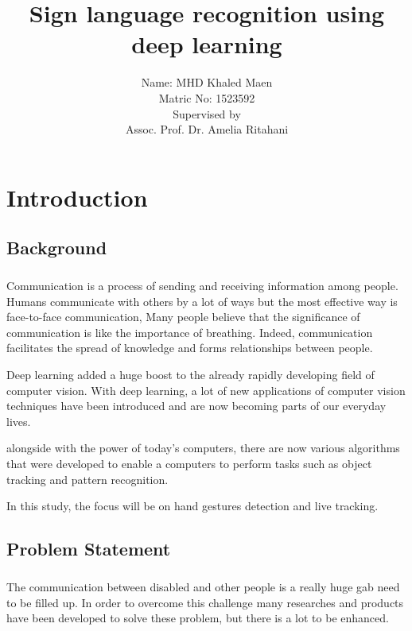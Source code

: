 \documentclass[12pt]{report}
\title{Sign language recognition using deep learning}
\author{ Name: MHD Khaled Maen\\
        Matric No: 1523592 \\ 
        [1.5cm]
        Supervised by\\
        Assoc. Prof. Dr. Amelia Ritahani \\}
\begin{document}
    \maketitle
    \setcounter{page}{2}                    
    \tableofcontents
    \newpage
    \chapter{Introduction} 
        \section{Background}
        \paragraph{}
        Communication is a process of sending and receiving information among people. 
        Humans communicate with others by a lot of ways but the most effective way is  face-to-face communication, 
        Many people believe that the significance of communication is like the importance of breathing. 
        Indeed, communication facilitates the spread of knowledge and forms relationships between people.
    
        Deep learning added a huge boost to the already rapidly developing field of computer vision.
        With deep learning, a lot of new applications of computer vision techniques have been introduced and are now becoming parts of our everyday lives.
    
        alongside  with  the power of today's computers, there are now various algorithms that were developed to enable a
        computers to perform tasks such as object tracking and pattern recognition. 
        
        In this study, the focus will be on hand gestures detection and live tracking. 
        \section{Problem Statement}
        \paragraph{}
        The communication between disabled and other people is
        a really huge gab need to be filled up.
        In order to overcome this challenge many researches and products have been developed to solve these problem, 
        but there is a lot to be enhanced.
        
\end{document}
